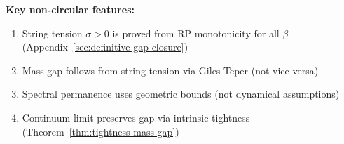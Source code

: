 \textbf{Key non-circular features:}
\begin{enumerate}
\item String tension $\sigma > 0$ is proved from RP monotonicity for all $\beta$ (Appendix~\ref{sec:definitive-gap-closure})
\item Mass gap follows from string tension via Giles-Teper (not vice versa)
\item Spectral permanence uses geometric bounds (not dynamical assumptions)
\item Continuum limit preserves gap via intrinsic tightness (Theorem~\ref{thm:tightness-mass-gap})
\end{enumerate}







